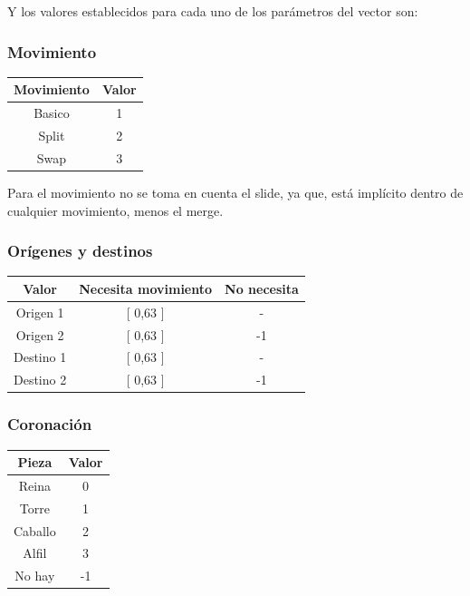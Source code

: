 Y los valores establecidos para cada uno de los parámetros del vector son:

\subsubsection{Movimiento}
\begin{center}
	\begin{tabular}{|c|c|}
		\hline
		\textbf{Movimiento} & \textbf{Valor} \\ \hline
		Basico & 1\\ \hline
		Split  & 2 \\\hline
		Swap   & 3 \\\hline
	\end{tabular}
\end{center}
Para el movimiento no se toma en cuenta el slide, ya que, está implícito dentro de cualquier movimiento, menos el merge.

\subsubsection{Orígenes y destinos}
\begin{center}
	\begin{tabular}{|c|c|c|}
		\hline
		\textbf{Valor} & \textbf{Necesita movimiento} & \textbf{No necesita} \\ \hline
		Origen 1    & [ 0,63 ] & -\\ \hline
		Origen 2    & [ 0,63 ] & -1\\\hline
		Destino 1   & [ 0,63 ] & -\\\hline
		Destino 2   & [ 0,63 ] & -1\\\hline
	\end{tabular}
\end{center}
\subsubsection{Coronación}
\begin{center}
	\begin{tabular}{|c|c|}
		\hline
		\textbf{Pieza} & \textbf{Valor} \\ \hline
		Reina & 0\\ \hline
		Torre  & 1 \\\hline
		Caballo   & 2 \\\hline
		Alfil   & 3 \\\hline
		No hay   & -1 \\\hline
	\end{tabular}    
\end{center}

